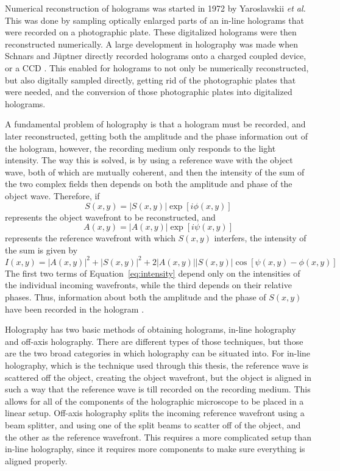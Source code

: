 Numerical reconstruction of holograms was started in 1972 by Yaroslavskii
\emph{et al.} This was done by sampling optically enlarged parts of an in-line
holograms that were recorded on a photographic plate. These digitalized
holograms were then reconstructed numerically. A large development in
holography was made when Schnars and J\"{u}ptner directly recorded holograms
onto a charged coupled device, or a CCD \cite{schnars_digital_2002}.
This enabled for holograms to not only
be numerically reconstructed, but also digitally sampled directly, getting rid
of the photographic plates that were needed, and the conversion of those
photographic plates into digitalized holograms.

A fundamental problem of holography is that a hologram must be recorded, and
later reconstructed, getting both the amplitude and the phase information out
of the hologram, however, the recording medium only responds to the light
intensity. The way this is solved, is by using a reference wave with the object
wave, both of which are mutually coherent, and then the intensity of the sum of
the two complex fields then depends on both the amplitude and phase of the
object wave. Therefore, if
\begin{equation}
    S(x,y) = \left| S(x,y) \right | \exp{[i\phi(x,y)]}
\end{equation}
represents the object wavefront to be reconstructed, and
\begin{equation}
    A(x,y) = \left| A(x,y) \right | \exp{[i\psi(x,y)]}
\end{equation}
represents the reference wavefront with which $S(x,y)$ interfers, the intensity
of the sum is given by
\begin{equation}
    I(x,y) = \left| A(x,y) \right |^2 + \left| S(x,y) \right |^2 + 2\left|
    A(x,y) \right |\left| S(x,y) \right |\cos{\left[ \psi(x,y)-\phi(x,y) \right]}
    \label{eq:intensity}
\end{equation}
The first two terms of Equation~\ref{eq:intensity} depend only on the
intensities of the individual incoming wavefronts, while the third depends on
their relative phases. Thus, information about both the amplitude and the phase
of $S(x,y)$ have been recorded in the hologram \cite{Goodman}.

Holography has two basic methods of obtaining holograms, in-line holography and
off-axis holography. There are different types of those techniques, but those
are the two broad categories in which holography can be situated into. For
in-line holography, which is the technique used through this thesis, the
reference wave is scattered off the object, creating the object wavefront, but
the object is aligned in such a way that the reference wave is till recorded on
the recording medium. This allows for all of the components of the holographic
microscope to be placed in a linear setup. Off-axis holography splits the
incoming reference wavefront using a beam splitter, and using one of the split
beams to scatter off of the object, and the other as the reference wavefront.
This requires a more complicated setup than in-line holography, since it
requires more components to make sure everything is aligned properly.

